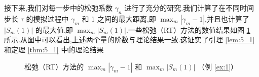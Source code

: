   接下来,我们对每一步中的松弛系数 $\gamma_n$ 进行了充分的研究.我们计算了在不同时间步长 $\tau$ 的模拟过程中 $\gamma_m$ 和 1 之间的最大距离,即 $\max _m\left|\gamma_m-1\right|$,并且也计算了 $\left|S_m(1)\right|$ 的最大值,即 $\max _m\left|S_m(1)\right|$.一些松弛（RT）方法的数值结果如图 \ref{fig:1} 所示.从图中可以看出,上述两个量的阶数与理论结果一致.这证实了引理 \ref{lem:5_1} 和定理 \ref{thm:5_1} 中的理论结果\begin{figure}[H]
	\begin{center}
	\caption{松弛（RT）方法的 $\max _m\left|\gamma_m-1\right|$ 和 $\max_m\left|S_m(1)\right|$ （例 \ref{ex:1}）} 
	\label{fig:1}
	\end{center}
	\end{figure}
  
